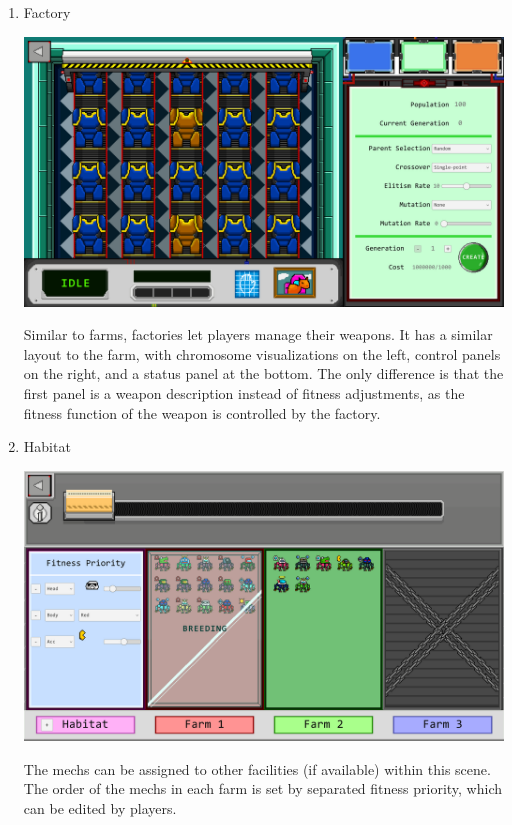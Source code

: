 \documentclass[12pt,oneside,openright,a4paper]{cpe-english-project}
\begin{document}
\begin{enumerate}
	\item Factory \\
	\begin{minipage}[c]{\textwidth}\centering
	\includegraphics[width=14cm]{figure/screenshot/screenshot-factory.png}
	\end{minipage}
	Similar to farms, factories let players manage their weapons. It has a similar layout to the farm, with chromosome visualizations on the left, control panels on the right, and a status panel at the bottom. The only difference is that the first panel is a weapon description instead of fitness adjustments, as the fitness function of the weapon is controlled by the factory.

	\item Habitat \\
	\begin{minipage}[c]{\textwidth}\centering
	\includegraphics[width=14cm]{figure/screenshot/screenshot-habitat.png}
	\end{minipage}
	The mechs can be assigned to other facilities (if available) within this scene. The order of the mechs in each farm is set by separated fitness priority, which can be edited by players.


\end{enumerate}
\end{document}
